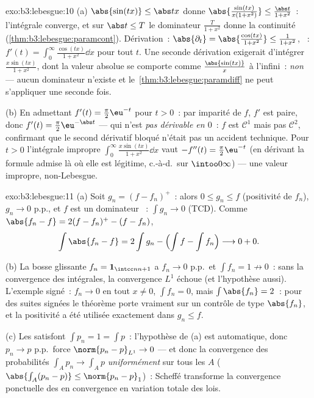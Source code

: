 \begin{solution}{exo:b3:lebesgue:10}
(a) $\abs{\sin(tx)} \leq \abs tx$ donne
$\abs{\frac{\sin(tx)}{x(1+x^2)}} \leq \frac{\abs
t}{1+x^2}$~: l'intégrale converge, et sur $\abs t \leq T$
le dominateur $\frac{T}{1+x^2}$ donne la continuité
(\cref{thm:b3:lebesgue:paramcont}). Dérivation~:
$\abs{\partial_t} = \abs{\frac{\cos(tx)}{1+x^2}} \leq
\frac1{1+x^2}$, ~: $f'(t) =
\int_0^\infty\frac{\cos(tx)}{1+x^2}\dd x$ pour tout $t$. Une
seconde dérivation exigerait d'intégrer
$\frac{x\sin(tx)}{1 + x^2}$, dont la valeur absolue se
comporte comme $\frac{\abs{\sin(tx)}} x$ à l'infini~:
\emph{non}  --- aucun dominateur n'existe et
le~\cref{thm:b3:lebesgue:paramdiff} ne peut s'appliquer une
seconde fois.

(b) En admettant $f'(t) = \frac\pi2\eu^{-t}$ pour $t > 0$~:
par imparité de $f$, $f'$ est paire, donc $f'(t) =
\frac\pi2\eu^{-\abs t}$ --- qui n'est \emph{pas dérivable
en $0$}~: $f$ est $\mathcal C^1$ mais pas $\mathcal C^2$,
confirmant que le second dérivatif bloqué n'était pas un
accident technique. Pour $t > 0$ l'intégrale impropre
$\int_0^\infty\frac{x\sin(tx)}{1+x^2}\dd x$ vaut $-f''(t) =
\frac\pi2\eu^{-t}$ (en dérivant la formule admise là où
elle est légitime, c.-à-d.\ sur $\intoo0\infty$) --- une
valeur impropre, non-Lebesgue.
\end{solution}

\begin{solution}{exo:b3:lebesgue:11}
(a) Soit $g_n = (f - f_n)^+$~: alors $0 \leq g_n \leq f$
(positivité de $f_n$), $g_n \to 0$ p.p., et $f$ est un
dominateur ~: $\int g_n \to 0$ (TCD). Comme
$\abs{f_n - f} = 2(f - f_n)^+ - (f - f_n)$,
\[
\int\abs{f_n - f} = 2\int g_n - \Bigl(\int f - \int
f_n\Bigr) \longrightarrow 0 + 0 .
\]

(b) La bosse glissante $f_n = \mathbf 1_{\intcc n{n+1}}$ a
$f_n \to 0$ p.p.\ et $\int f_n = 1 \not\to 0$~: sans la
convergence des intégrales, la convergence $L^1$ échoue (et
l'hypothèse aussi). L'exemple signé~: $f_n \to 0$ en tout
$x \neq 0$, $\int f_n = 0$, mais $\int\abs{f_n} = 2$~: pour
des suites signées le théorème porte vraiment sur un
contrôle de type $\abs{f_n}$, et la positivité a été
utilisée exactement dans $g_n \leq f$.

(c) Les  satisfont $\int p_n = 1 = \int p$~:
l'hypothèse de (a) est automatique, donc $p_n \to p$ p.p.\
force $\norm{p_n - p}_{L^1} \to 0$ --- et donc la
convergence des probabilités $\int_Ap_n \to \int_Ap$
\emph{uniformément} sur tous les $A$ 
($\abs{\int_A(p_n - p)} \leq \norm{p_n - p}_1$)~: Scheffé
transforme la convergence ponctuelle des  en
convergence en variation totale des lois.
\end{solution}

